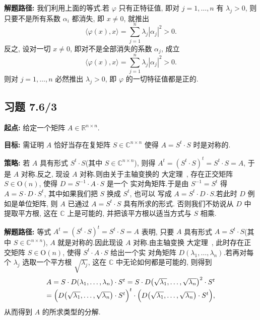 \noindent\textbf{解题路径:} 我们利用上面的等式.若 $\varphi$ 只有正特征值, 即对 $j = 1, \ldots, n$ 有
$\lambda_j > 0$, 则只要不是所有系数 $\alpha_i$ 都消失, 即 $x \neq 0$, 就推出
\[
\langle \varphi(x), x \rangle = \sum_{j = 1}^{n} \lambda_j |\alpha_j|^2 > 0\text{.}
\]
反之, 设对一切 $x \neq 0$, 即对不是全部消失的系数 $\alpha_j$, 成立
\[
\langle \varphi(x), x \rangle = \sum_{j = 1}^{n} \lambda_j |\alpha_j|^2 > 0\text{.}
\]
则对 $j = 1, \ldots, n$ 必然推出 $\lambda_j > 0$, 即 $\varphi$ 的一切特征值都是正的.

\subsection*{习题 7.6/3}

\noindent\textbf{起点:} 给定一个矩阵 $A \in \mathbb{R}^{n \times n}$.

\noindent\textbf{目标:} 需证明 $A$ 恰好当存在复矩阵 $S \in \mathbb{C}^{n \times n}$ 使得 $A = S^t \cdot S$
时是对称的.

\noindent\textbf{策略:} 若 $A$ 具有形式 $S^t \cdot S$(其中 $S \in \mathbb{C}^{n \times n}$), 则得
$A^t = (S^t \cdot S)^t = S^t \cdot S = A$, 于是 $A$ 对称.反之, 现设 $A$ 对称.则由关于主轴变换的
大定理~, 存在正交矩阵 $S \in \mathrm{O}(n)$, 使得 $D = S^{-1} \cdot A \cdot S$ 是一个
实对角矩阵.于是由 $S^{-1} = S^t$ 得 $A = S \cdot D \cdot S^t$, 其中如果我们把 $S$ 换成 $S^t$, 也可以
写成 $A = S^t \cdot D \cdot S$.若此时 $D$ 例如是单位矩阵, 则 $A$ 已通过 $A = S^t \cdot S$ 具有所求的形式.
否则我们不妨说从 $D$ 中提取平方根, 这在 $\mathbb{C}$ 上是可能的, 并把该平方根以适当方式与 $S$ 相乘.

\noindent\textbf{解题路径:} 等式 $A^t = (S^t \cdot S)^t = S^t \cdot S = A$ 表明, 只要 $A$ 具有形式
$A = S^t \cdot S$(其中 $S \in \mathbb{C}^{n \times n}$), $A$ 就是对称的.因此现设 $A$ 对称.由主轴变换
大定理~, 此时存在正交矩阵 $S \in \mathrm{O}(n)$, 使得 $S^t \cdot A \cdot S$ 给出一个实
对角矩阵 $D(\lambda_1, \ldots, \lambda_n)$.若再对每个 $\lambda_j$ 选取一个平方根 $\sqrt{\lambda_j}$, 这在
$\mathbb{C}$ 中无论如何都是可能的, 则得到
\[
\begin{array}{c}
A = S \cdot D(\lambda_1, \ldots, \lambda_n) \cdot S^t = S \cdot D\bigl(\sqrt{\lambda_1}, \ldots, \sqrt{\lambda_n}\bigr)^2 \cdot S^t \\[2pt]
= \Bigl(D\bigl(\sqrt{\lambda_1}, \ldots, \sqrt{\lambda_n}\bigr) \cdot S^t\Bigr)^t \cdot \Bigl(D\bigl(\sqrt{\lambda_1}, \ldots, \sqrt{\lambda_n}\bigr) \cdot S^t\Bigr),
\end{array}
\]
从而得到 $A$ 的所求类型的分解.
